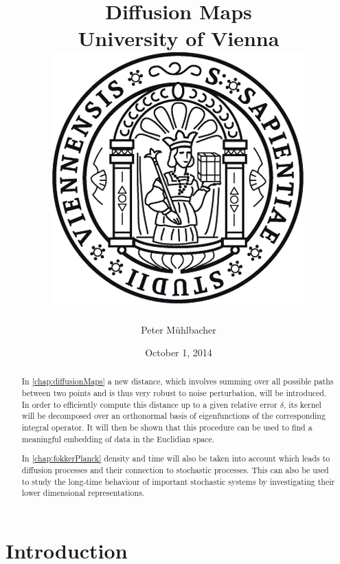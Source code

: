 \documentclass[11pt]{report}
\begin{document}
\title{
	{Diffusion Maps}\\
	{\large University of Vienna}\\
	{\includegraphics{university.png}}
}
\author{Peter Mühlbacher}
\date{October 1, 2014}
\maketitle

\begin{abstract}
In \autoref{chap:diffusionMaps} a new distance, which involves summing over all possible paths between two points and is thus very robust to noise perturbation, will be introduced. In order to efficiently compute this distance up to a given relative error $\delta$, its kernel will be decomposed over an orthonormal basis of eigenfunctions of the corresponding integral operator. It will then be shown that this procedure can be used to find a meaningful embedding of data in the Euclidian space.

In \autoref{chap:fokkerPlanck} density and time will also be taken into account which leads to diffusion processes and their connection to stochastic processes. This can also be used to study the long-time behaviour of important stochastic systems by investigating their lower dimensional representations.
\end{abstract}

\tableofcontents

\chapter*{Introduction}

\end{document}
